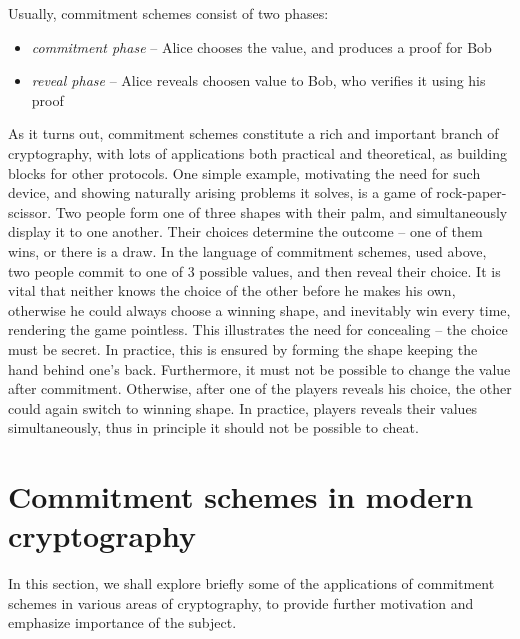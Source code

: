 \documentclass[10pt]{article}
\begin{document}
Usually, commitment schemes consist of two phases:

\begin{itemize}
  \item \emph{commitment phase} -- Alice chooses the value, and produces a proof for Bob
  \item \emph{reveal phase} -- Alice reveals choosen value to Bob, who verifies it using his proof
\end{itemize}

As it turns out, commitment schemes constitute a rich and important branch of cryptography, with lots of
applications both practical and theoretical, as building blocks for other protocols. One simple example,
motivating the need for such device, and showing naturally arising problems it solves, is a game of 
rock-paper-scissor. Two people form one of three shapes with their palm, and simultaneously display it
to one another. Their choices determine the outcome -- one of them wins, or there is a draw. In the
language of commitment schemes, used above, two people commit to one of 3 possible values, and then reveal
their choice. It is vital that neither knows the choice of the other before he makes his own, otherwise
he could always choose a winning shape, and inevitably win every time, rendering the game pointless.
This illustrates the need for concealing -- the choice must be secret. In practice, this is ensured
by forming the shape keeping the hand behind one's back. Furthermore, it must not be possible to change
the value after commitment. Otherwise, after one of the players reveals his choice, the other could again
switch to winning shape. In practice, players reveals their values simultaneously, thus in principle it
should not be possible to cheat.\footnotemark



\section{Commitment schemes in modern cryptography}

In this section, we shall explore briefly some of the applications of commitment schemes in various
areas of cryptography, to provide further motivation and emphasize importance of the subject.
\end{document}
